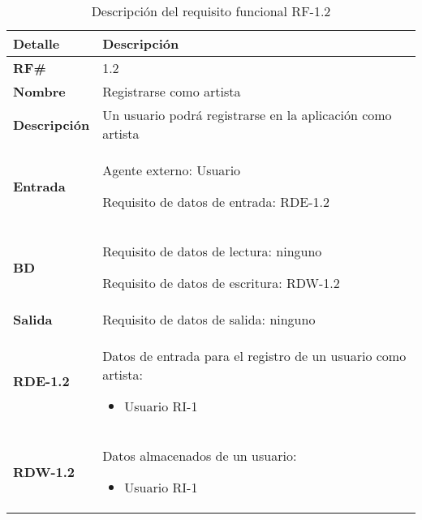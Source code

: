\begin{table}[H]
    \centering
    \begin{tabular}{|p{4cm}|p{7cm}|}
        \hline
        \rowcolor{lightgray}
        \textbf{Detalle} & \textbf{Descripción} \\
        \hline
        \textbf{RF\#} & 1.2 \\
        \hline
        \textbf{Nombre} & Registrarse como artista \\
        \hline
        \textbf{Descripción} & Un usuario podrá registrarse en la aplicación como artista \\
        \hline
        \textbf{Entrada} &
        Agente externo: Usuario
        
        Requisito de datos de entrada: RDE-1.2 \\
        \hline
        \textbf{BD} &
        Requisito de datos de lectura: ninguno
        
        Requisito de datos de escritura: RDW-1.2 \\
        \hline
        \textbf{Salida} & Requisito de datos de salida: ninguno \\
        \hline
        \textbf{RDE-1.2} & Datos de entrada para el registro de un usuario como artista:
            \begin{itemize}
                \item Usuario RI-1
            \end{itemize} \\
        \hline
        \textbf{RDW-1.2} & Datos almacenados de un usuario:
            \begin{itemize}
                \item Usuario RI-1
            \end{itemize} \\
        \hline
    \end{tabular}
    \caption{Descripción del requisito funcional RF-1.2}
    \label{tab:rf-1-2}
\end{table}


